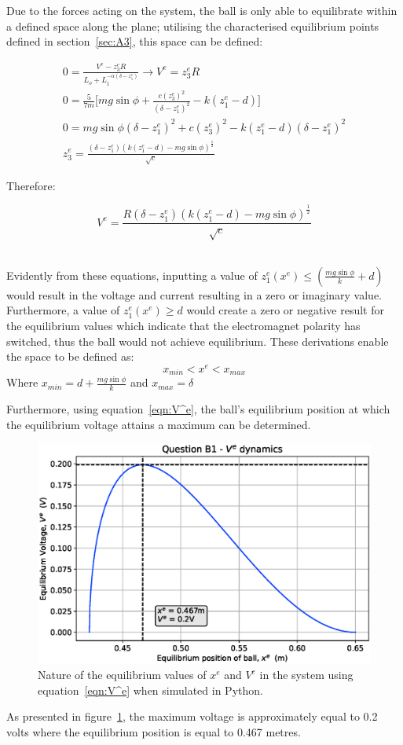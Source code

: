 \documentclass[a4paper,10pt,reqno]{amsart}
\numberwithin{equation}{section}
\begin{document}
\par Due to the forces acting on the system, the ball is only able to equilibrate within a defined space along the plane; utilising the characterised equilibrium points defined in section~\ref{sec:A3}, this space can be defined:

\begin{gather*}
    0=\frac{V^e-z_3^eR}{L_o+L_1^{-\alpha(\delta-z_1^e)}} \rightarrow V^e = z_3^eR
    \\
    0 = \frac{5}{7m}\bigg[mg\sin{\phi}+\frac{c(z_3^e)^2}{(\delta-z_1^e)^2}-k(z_1^e-d)\bigg]
    \\
    0 = mg\sin{\phi}(\delta-z_1^e)^2 + c(z_3^e)^2 - k(z_1^e-d)(\delta-z_1^e)^2
    \\
    z_3^e = \frac{(\delta-z_1^e)(k(z_1^e-d)-mg\sin{\phi})^\frac{1}{2}}{\sqrt{c}}
\end{gather*}

\par Therefore:

\begin{equation}
\label{eqn:V^e}
    V^e = \frac{R(\delta-z_1^e)(k(z_1^e-d)-mg\sin{\phi})^\frac{1}{2}}{\sqrt{c}}
\end{equation}
\\
\par Evidently from these equations, inputting a value of $z_1^e(x^e) \leq (\frac{mg\sin{\phi}}{k}+d)$ would result in the voltage and current resulting in a zero or imaginary value. Furthermore, a value of $z_1^e(x^e) \geq d$ would create a zero or negative result for the equilibrium values which indicate that the electromagnet polarity has switched, thus the ball would not achieve equilibrium. These derivations enable the space to be defined as:
\begin{equation}
    x_{min} < x^e < x_{max}
\end{equation}
 Where $x_{min} = d + \frac{mg\sin{\phi}}{k}$ and $x_{max} = \delta$

\newpage
\par Furthermore, using equation~\ref{eqn:V^e}, the ball's equilibrium position at which the equilibrium voltage attains a maximum can be determined.
\begin{figure}[h]
 \centering
 \includegraphics[width=0.6\linewidth]{Figures/B1.eps}
 \caption{Nature of the equilibrium values of $x^e$ and $V^e$ in the system using equation~\ref{eqn:V^e} when simulated in Python.}
 \label{fig:B1Diagram}
\end{figure}
\par As presented in figure~\ref{fig:B1Diagram}, the maximum voltage is approximately equal to 0.2 volts where the equilibrium position is equal to 0.467 metres.
\end{document}
